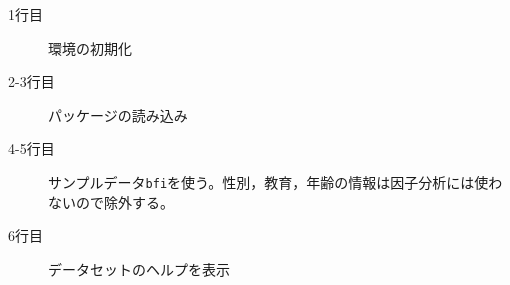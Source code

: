 \begin{description}
	\item[1行目] 環境の初期化
	\item[2-3行目] パッケージの読み込み
	\item[4-5行目] サンプルデータ\texttt{bfi}を使う。性別，教育，年齢の情報は因子分析には使わないので除外する。
	\item[6行目] データセットのヘルプを表示
\end{description}

